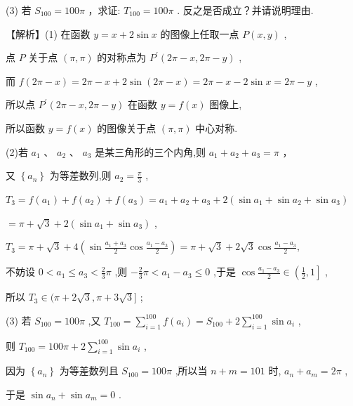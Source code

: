 \documentclass[10pt]{article}
\begin{document}
(3) 若 \({S}_{100} = {100\pi }\) ，求证: \({T}_{100} = {100\pi }\) . 反之是否成立？并请说明理由.

【解析】(1) 在函数 \(y = x + 2\sin x\) 的图像上任取一点 \(P\left( {x,y}\right)\) ,

点 \(P\) 关于点 \(\left( {\pi ,\pi }\right)\) 的对称点为 \({P}^{\prime }\left( {{2\pi } - x,{2\pi } - y}\right)\) ,

而 \(f\left( {{2\pi } - x}\right)  = {2\pi } - x + 2\sin \left( {{2\pi } - x}\right)  = {2\pi } - x - 2\sin x = {2\pi } - y\) ,

所以点 \({P}^{\prime }\left( {{2\pi } - x,{2\pi } - y}\right)\) 在函数 \(y = f\left( x\right)\) 图像上,

所以函数 \(y = f\left( x\right)\) 的图像关于点 \(\left( {\pi ,\pi }\right)\) 中心对称.

(2)若 \({a}_{1}\text{ 、 }{a}_{2}\text{ 、 }{a}_{3}\) 是某三角形的三个内角,则 \({a}_{1} + {a}_{2} + {a}_{3} = \pi\) ，

又 \(\left\{  {a}_{n}\right\}\) 为等差数列,则 \({a}_{2} = \frac{\pi }{3}\) ,

\({T}_{3} = f\left( {a}_{1}\right)  + f\left( {a}_{2}\right)  + f\left( {a}_{3}\right)  = {a}_{1} + {a}_{2} + {a}_{3} + 2\left( {\sin {a}_{1} + \sin {a}_{2} + \sin {a}_{3}}\right)\)

\(= \pi  + \sqrt{3} + 2\left( {\sin {a}_{1} + \sin {a}_{3}}\right)\) ,

\({T}_{3} = \pi  + \sqrt{3} + 4\left( {\sin \frac{{a}_{1} + {a}_{3}}{2}\cos \frac{{a}_{1} - {a}_{3}}{2}}\right)  = \pi  + \sqrt{3} + 2\sqrt{3}\cos \frac{{a}_{1} - {a}_{3}}{2},\)

不妨设 \(0 < {a}_{1} \leq  {a}_{3} < \frac{2}{3}\pi\) ,则 \(- \frac{2}{3}\pi  < {a}_{1} - {a}_{3} \leq  0\) ,于是 \(\cos \frac{{a}_{1} - {a}_{3}}{2} \in  \left( {\frac{1}{2},1}\right\rbrack\) ,

所以 \({T}_{3} \in  (\pi  + 2\sqrt{3},\pi  + 3\sqrt{3}\rbrack\) ;

(3) 若 \({S}_{100} = {100\pi }\) ,又 \({T}_{100} = \mathop{\sum }\limits_{{i = 1}}^{{100}}f\left( {a}_{i}\right)  = {S}_{100} + 2\mathop{\sum }\limits_{{i = 1}}^{{100}}\sin {a}_{i}\) ,

则 \({T}_{100} = {100\pi } + 2\mathop{\sum }\limits_{{i = 1}}^{{100}}\sin {a}_{i}\) ,

因为 \(\left\{  {a}_{n}\right\}\) 为等差数列且 \({S}_{100} = {100\pi }\) ,所以当 \(n + m = {101}\) 时, \({a}_{n} + {a}_{m} = {2\pi }\) ,

于是 \(\sin {a}_{n} + \sin {a}_{m} = 0\) .
\end{document}
